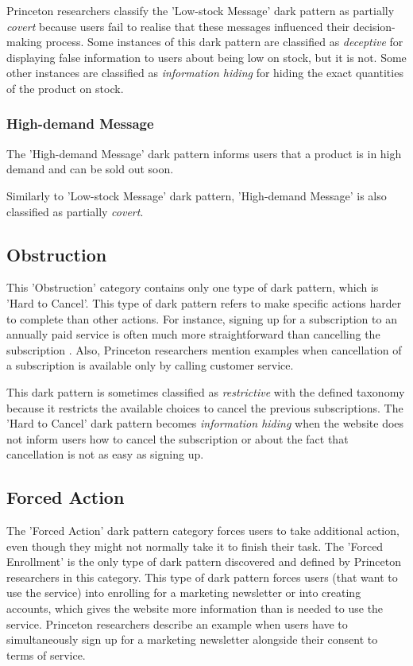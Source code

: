         Princeton researchers classify the 'Low-stock Message' dark pattern as partially \emph{covert} because users fail to realise that these messages influenced their decision-making process. Some instances of this dark pattern are classified as \emph{deceptive} for displaying false information to users about being low on stock, but it is not. Some other instances are classified as \emph{information hiding} for hiding the exact quantities of the product on stock.

        \subsubsection{High-demand Message}
        The 'High-demand Message' dark pattern informs users that a product is in high demand and can be sold out soon.

        Similarly to 'Low-stock Message' dark pattern, 'High-demand Message' is also classified as partially \emph{covert}.

    \subsection{Obstruction}
    This 'Obstruction' category contains only one type of dark pattern, which is 'Hard to Cancel'. This type of dark pattern refers to make specific actions harder to complete than other actions. For instance, signing up for a subscription to an annually paid service is often much more straightforward than cancelling the subscription \cite{unbounce-subscription}. Also, Princeton researchers mention examples when cancellation of a subscription is available only by calling customer service\cite{dark-patterns-at-scale}.

    This dark pattern is sometimes classified as \emph{restrictive} with the defined taxonomy because it restricts the available choices to cancel the previous subscriptions. The 'Hard to Cancel' dark pattern becomes \emph{information hiding} when the website does not inform users how to cancel the subscription or about the fact that cancellation is not as easy as signing up.

    \subsection{Forced Action}
    The 'Forced Action' dark pattern category forces users to take additional action, even though they might not normally take it to finish their task. The 'Forced Enrollment' is the only type of dark pattern discovered and defined by Princeton researchers in this category. This type of dark pattern forces users (that want to use the service) into enrolling for a marketing newsletter or into creating accounts, which gives the website more information than is needed to use the service. Princeton researchers describe an example when users have to simultaneously sign up for a marketing newsletter alongside their consent to terms of service.
    
